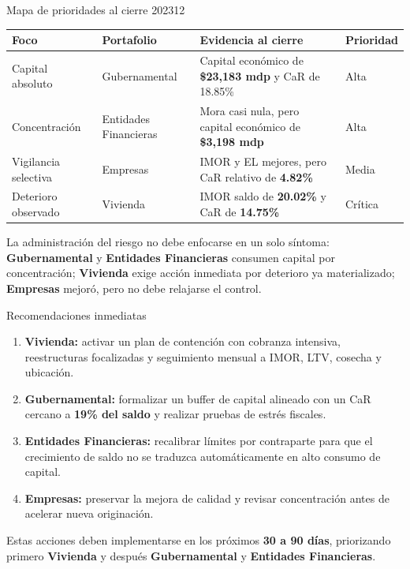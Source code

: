 \documentclass[aspectratio=169,10pt]{beamer}
\newcommand{\mdp}{mdp}
\newcommand{\smallhead}[1]{\vspace{0.08cm}{\color{udlapblue}\textbf{#1}}\par\vspace{0.02cm}}
\begin{document}
\begin{frame}{Mapa de prioridades al cierre 202312}
\small
\centering
\begin{tabular}{L{2.7cm}L{2.4cm}L{4.0cm}C{1.8cm}}
\toprule
{}
\textbf{Foco} & \textbf{Portafolio} & \textbf{Evidencia al cierre} & \textbf{Prioridad} \\
\midrule
Capital absoluto & Gubernamental & Capital económico de \textbf{\$23,183 \mdp} y CaR de 18.85\% & Alta \\
Concentración & Entidades Financieras & Mora casi nula, pero capital económico de \textbf{\$3,198 \mdp} & Alta \\
Vigilancia selectiva & Empresas & IMOR y EL mejores, pero CaR relativo de \textbf{4.82\%} & Media \\
Deterioro observado & Vivienda & IMOR saldo de \textbf{20.02\%} y CaR de \textbf{14.75\%} & Crítica \\
\bottomrule
\end{tabular}

\vspace{0.25cm}
\smallhead{Conclusión comparativa}
La administración del riesgo no debe enfocarse en un solo síntoma: \textbf{Gubernamental} y
\textbf{Entidades Financieras} consumen capital por concentración; \textbf{Vivienda} exige acción
inmediata por deterioro ya materializado; \textbf{Empresas} mejoró, pero no debe relajarse el control.
\end{frame}

\begin{frame}{Recomendaciones inmediatas}
\small
\begin{enumerate}
  \item \textbf{Vivienda:} activar un plan de contención con cobranza intensiva, reestructuras focalizadas y seguimiento mensual a IMOR, LTV, cosecha y ubicación.
  \item \textbf{Gubernamental:} formalizar un buffer de capital alineado con un CaR cercano a \textbf{19\% del saldo} y realizar pruebas de estrés fiscales.
  \item \textbf{Entidades Financieras:} recalibrar límites por contraparte para que el crecimiento de saldo no se traduzca automáticamente en alto consumo de capital.
  \item \textbf{Empresas:} preservar la mejora de calidad y revisar concentración antes de acelerar nueva originación.
\end{enumerate}

\vspace{0.2cm}
\smallhead{Horizonte}
Estas acciones deben implementarse en los próximos \textbf{30 a 90 días}, priorizando primero
\textbf{Vivienda} y después \textbf{Gubernamental} y \textbf{Entidades Financieras}.
\end{frame}
\end{document}
